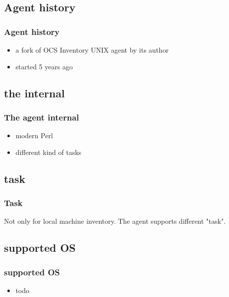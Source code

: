 %
\subsection{Agent history}
\begin{frame}
\frametitle{Agent history}

\begin{itemize}
%
\item a fork of OCS Inventory UNIX agent by its author
\item started 5 years ago
%
\end{itemize}
\end{frame}
\subsection{the internal}
\begin{frame}
\frametitle{The agent internal}
%
\begin{itemize}
%
\item modern Perl
\item different kind of tasks
%
\end{itemize}
\end{frame}

\subsection{task}
\begin{frame}
\frametitle{Task}
%
Not only for local machine inventory. The agent supports different "task".
\end{frame}



\subsection{supported OS}
\begin{frame}
\frametitle{supported OS}
%
\begin{itemize}
%
\item todo 
%
\end{itemize}
\end{frame}

